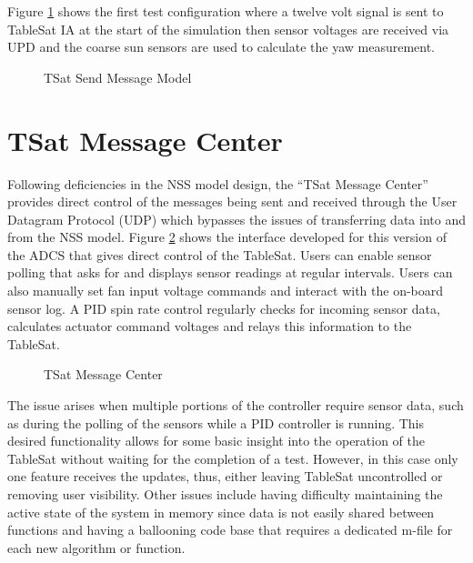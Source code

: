 Figure \ref{fig:TSatSimulinkSendMessageModel} shows the first test configuration where a twelve volt signal is sent to TableSat IA at the start of the simulation then sensor voltages are received via UPD and the coarse sun sensors are used to calculate the yaw measurement.

\begin{figure}[ht]
  \centerline{}
  \caption{TSat Send Message Model}
  \label{fig:TSatSimulinkSendMessageModel}
\end{figure}

\section{TSat Message Center}
\label{sec:TSatMessageCenter}

Following deficiencies in the NSS model design, the ``TSat Message Center'' provides direct control of the messages being sent and received through the User Datagram Protocol (UDP) which bypasses the issues of transferring data into and from the NSS model.  Figure \ref{fig:TSatMessageCenter} shows the interface developed for this version of the ADCS that gives direct control of the TableSat.  Users can enable sensor polling that asks for and displays sensor readings at regular intervals.  Users can also manually set fan input voltage commands and interact with the on-board sensor log.  A PID spin rate control regularly checks for incoming sensor data, calculates actuator command voltages and relays this information to the TableSat.
\begin{figure}[ht]
  \centerline{}
  \caption{TSat Message Center}
  \label{fig:TSatMessageCenter}
\end{figure}

The issue arises when multiple portions of the controller require sensor data, such as during the polling of the sensors while a PID controller is running.  This desired functionality allows for some basic insight into the operation of the TableSat without waiting for the completion of a test.  However, in this case only one feature receives the updates, thus, either leaving TableSat uncontrolled or removing user visibility.  Other issues include having difficulty maintaining the active state of the system in memory since data is not easily shared between functions and having a ballooning code base that requires a dedicated m-file for each new algorithm or function.

